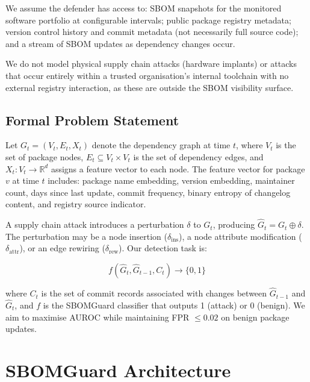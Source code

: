 \documentclass[sigconf,nonacm]{acmart}
\begin{document}
We assume the defender has access to: SBOM snapshots for the monitored software
portfolio at configurable intervals; public package registry metadata; version control
history and commit metadata (not necessarily full source code); and a stream of
SBOM updates as dependency changes occur.

We do not model physical supply chain attacks (hardware implants) or attacks that
occur entirely within a trusted organisation's internal toolchain with no external
registry interaction, as these are outside the SBOM visibility surface.

\subsection{Formal Problem Statement}

Let $G_t = (V_t, E_t, X_t)$ denote the dependency graph at time $t$, where $V_t$
is the set of package nodes, $E_t \subseteq V_t \times V_t$ is the set of
dependency edges, and $X_t : V_t \to \mathbb{R}^d$ assigns a feature vector to
each node. The feature vector for package $v$ at time $t$ includes:
package name embedding, version embedding, maintainer count, days since last
update, commit frequency, binary entropy of changelog content, and registry
source indicator.

A supply chain attack introduces a perturbation $\delta$ to $G_t$, producing
$\hat{G}_t = G_t \oplus \delta$. The perturbation may be a node insertion
($\delta_{\text{ins}}$), a node attribute modification ($\delta_{\text{attr}}$),
or an edge rewiring ($\delta_{\text{rew}}$). Our detection task is:

\begin{equation}
  f(\hat{G}_t, \hat{G}_{t-1}, C_t) \to \{0, 1\}
\end{equation}

where $C_t$ is the set of commit records associated with changes between
$\hat{G}_{t-1}$ and $\hat{G}_t$, and $f$ is the SBOMGuard classifier that
outputs 1 (attack) or 0 (benign). We aim to maximise AUROC while
maintaining FPR $\leq 0.02$ on benign package updates.

\section{SBOMGuard Architecture}
\end{document}

